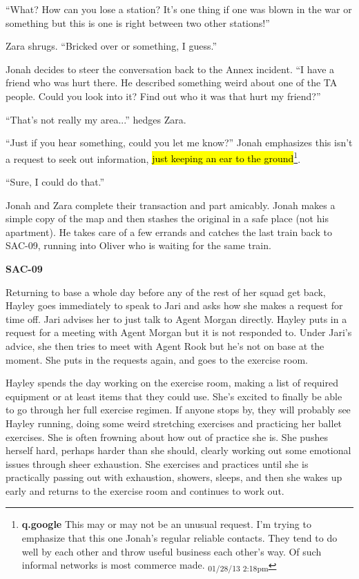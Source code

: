 ``What?  How can you lose a station?  It's one thing if one was blown in the war or something but this is one is right between two other stations!''

Zara shrugs.  ``Bricked over or something, I guess.''



Jonah decides to steer the conversation back to the Annex incident.  ``I have a friend who was hurt there.  He described something weird about one of the TA people.  Could you look into it?  Find out who it was that hurt my friend?''

``That's not really my area...'' hedges Zara.

``Just if you hear something, could you let me know?''  Jonah emphasizes this isn't a request to seek out information, \hl{just keeping an ear to the ground}\footnote{\textbf{q.google }This may or may not be an unusual request.  I'm trying to emphasize that this one Jonah's regular reliable contacts.  They tend to do well by each other and throw useful business each other's way.  Of such informal networks is most commerce made. \textsubscript{01/28/13 2:18pm}}.

``Sure, I could do that.''



Jonah and Zara complete their transaction and part amicably.  Jonah makes a simple copy of the map and then stashes the original in a safe place (not his apartment).  He takes care of a few errands and catches the last train back to SAC-09, running into Oliver who is waiting for the same train.





 {\LARGE \textbf{SAC-09} } 



Returning to base a whole day before any of the rest of her squad get back, Hayley goes immediately to speak to Jari and asks how she makes a request for time off.  Jari advises her to just talk to Agent Morgan directly.  Hayley puts in a request for a meeting with Agent Morgan but it is not responded to.  Under Jari's advice, she then tries to meet with Agent Rook but he's not on base at the moment.  She puts in the requests again, and goes to the exercise room.



Hayley spends the day working on the exercise room, making a list of required equipment or at least items that they could use.  She's excited to finally be able to go through her full exercise regimen.  If anyone stops by, they will probably see Hayley running, doing some weird stretching exercises and practicing her ballet exercises.  She is often frowning about how out of practice she is.  She pushes herself hard, perhaps harder than she should, clearly working out some emotional issues through sheer exhaustion.  She exercises and practices until she is practically passing out with exhaustion, showers, sleeps, and then she wakes up early and returns to the exercise room and continues to work out.



